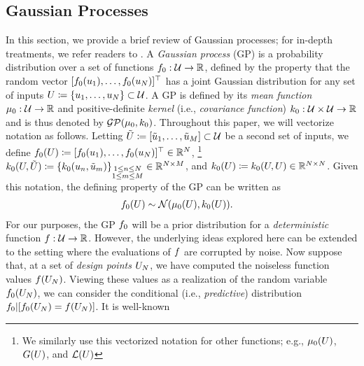 \documentclass[12pt]{article}
\begin{document}
\subsection{Gaussian Processes}
In this section, we provide a brief review of Gaussian processes; for in-depth treatments, we refer readers to 
\cite{gramacy2020surrogates, StuartTeck2, gpML}. A \textit{Gaussian process} (GP) is a probability 
distribution over a set of functions $f_{0}: \mathcal{U} \to \mathbb{R}$, defined by the property that 
the random vector $[f_{0}(u_1), \dots, f_{0}(u_N)]^\top$ has
a joint Gaussian distribution for any set of inputs $U \coloneqq \{u_1, \dots, u_N\} \subset \mathcal{U}$. 
A GP is defined by its \textit{mean function} $\mu_0: \mathcal{U} \to \mathbb{R}$ and positive-definite \textit{kernel} 
(i.e., \textit{covariance function}) $k_0: \mathcal{U} \times \mathcal{U} \to \mathbb{R}$ and is thus denoted by 
$\mathcal{GP}(\mu_0, k_0)$. Throughout this paper, we will vectorize notation as follows. Letting 
$\tilde{U} \coloneqq [\tilde{u}_1, \dots, \tilde{u}_M]  \subset \mathcal{U}$ be a second set of inputs, we define 
$f_{0}(U) \coloneqq [f_{0}(u_1), \dots, f_{0}(u_N)]^\top \in \mathbb{R}^{N}$, 
\footnote{We similarly use this vectorized notation for other functions; e.g., $\mu_0(U)$, $G(U)$, and $\mathcal{L}(U)$}
$k_0(U, \tilde{U}) \coloneqq \{k_0(u_{n}, \tilde{u}_m)\}_{\substack{1 \leq n \leq N \\ 1 \leq m \leq M}} \in \mathbb{R}^{N \times M}$, 
and $k_0(U) \coloneqq k_0(U, U) \in \mathbb{R}^{N \times N}$. Given this notation, 
the defining property of the GP can be written as 
\begin{align}
f_{0}(U) &\sim \mathcal{N}(\mu_0(U), k_0(U)).
\end{align}
For our purposes, the GP $f_{0}$ will be a prior distribution for a \textit{deterministic} function $f: \mathcal{U} \to \mathbb{R}$. 
However, the underlying ideas explored here can be extended to the setting where the evaluations of $f$ 
are corrupted by noise. 
Now suppose that, at a set of \textit{design points} $U_{N}$, we have computed the noiseless function values
$f(U_{N})$. Viewing these values as a realization of the random variable $f_{0}(U_{N})$, we can 
consider the conditional (i.e., \textit{predictive}) distribution $f_{0}|[f_{0}(U_{N})=f(U_{N})]$. It is well-known
\end{document}
